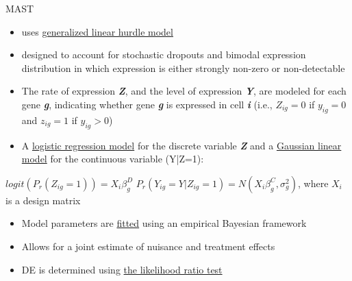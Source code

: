 \documentclass{beamer}\usepackage[]{graphicx}\usepackage[]{color}
\begin{document}
\begin{frame}
\begin{block}{MAST}
\vspace{0.5cm}
\scriptsize
\begin{itemize}
  \item uses \underline{generalized linear hurdle model}
  \item designed to account for stochastic dropouts and bimodal expression distribution in which expression is either strongly non-zero or non-detectable
  \item The rate of expression \textbf{\textit{Z}}, and the level of expression \textbf{\textit{Y}}, are modeled for each gene \textbf{\textit{g}}, indicating whether gene \textbf{\textit{g}} is expressed in cell \textbf{\textit{i}} (i.e., $Z_{ig}=0$ if $y_{ig}=0$ and $z_{ig}=1$ if $y_{ig}>0$)
  \item A \underline{logistic regression model} for the discrete variable \textbf{\textit{Z}} and a \underline{Gaussian linear model} for the continuous variable (Y|Z=1):
   \end{itemize}
   \begin{center}
    $logit (P_r(Z_{ig}=1))=X_i\beta_g^D$ \newline
    $P_r(Y_{ig}=Y|Z_{ig}=1)=N(X_i\beta_g^C,\sigma_g^2)$, where $X_i$ is a design matrix
\end{center}
\begin{itemize}
\item Model parameters are \underline{fitted} using an empirical Bayesian framework
\item Allows for a joint estimate of nuisance and treatment effects
\item DE is determined using \underline{the likelihood ratio test}
\end{itemize}
\end{block}
\end{frame}
\end{document}
